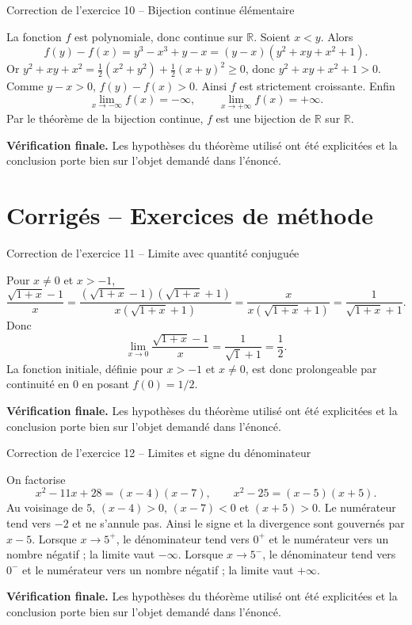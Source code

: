 \documentclass[11pt,a4paper]{article}
\newcommand{\R}{\mathbb{R}}
\begin{document}
\begin{corrbox}{Correction de l'exercice 10 -- Bijection continue élémentaire}

La fonction $f$ est polynomiale, donc continue sur $\R$. Soient $x<y$. Alors
\[
f(y)-f(x)=y^3-x^3+y-x=(y-x)(y^2+xy+x^2+1).
\]
Or $y^2+xy+x^2=\frac12(x^2+y^2)+\frac12(x+y)^2\geq0$, donc $y^2+xy+x^2+1>0$. Comme $y-x>0$, $f(y)-f(x)>0$. Ainsi $f$ est strictement croissante. Enfin
\[
\lim_{x\to-\infty}f(x)=-\infty,\qquad \lim_{x\to+\infty}f(x)=+\infty.
\]
Par le théorème de la bijection continue, $f$ est une bijection de $\R$ sur $\R$.

\medskip
\textbf{Vérification finale.} Les hypothèses du théorème utilisé ont été explicitées et la conclusion porte bien sur l'objet demandé dans l'énoncé.
\end{corrbox}


\section{Corrigés -- Exercices de méthode}
\begin{corrbox}{Correction de l'exercice 11 -- Limite avec quantité conjuguée}

Pour $x\neq0$ et $x>-1$,
\[
\frac{\sqrt{1+x}-1}{x}=\frac{(\sqrt{1+x}-1)(\sqrt{1+x}+1)}{x(\sqrt{1+x}+1)}=\frac{x}{x(\sqrt{1+x}+1)}=\frac1{\sqrt{1+x}+1}.
\]
Donc
\[
\lim_{x\to0}\frac{\sqrt{1+x}-1}{x}=\frac1{\sqrt1+1}=\frac12.
\]
La fonction initiale, définie pour $x>-1$ et $x\neq0$, est donc prolongeable par continuité en $0$ en posant $f(0)=1/2$.

\medskip
\textbf{Vérification finale.} Les hypothèses du théorème utilisé ont été explicitées et la conclusion porte bien sur l'objet demandé dans l'énoncé.
\end{corrbox}


\begin{corrbox}{Correction de l'exercice 12 -- Limites et signe du dénominateur}

On factorise
\[
x^2-11x+28=(x-4)(x-7),\qquad x^2-25=(x-5)(x+5).
\]
Au voisinage de $5$, $(x-4)>0$, $(x-7)<0$ et $(x+5)>0$. Le numérateur tend vers $-2$ et ne s'annule pas. Ainsi le signe et la divergence sont gouvernés par $x-5$. Lorsque $x\to5^+$, le dénominateur tend vers $0^+$ et le numérateur vers un nombre négatif ; la limite vaut $-\infty$. Lorsque $x\to5^-$, le dénominateur tend vers $0^-$ et le numérateur vers un nombre négatif ; la limite vaut $+\infty$.

\medskip
\textbf{Vérification finale.} Les hypothèses du théorème utilisé ont été explicitées et la conclusion porte bien sur l'objet demandé dans l'énoncé.
\end{corrbox}
\end{document}
